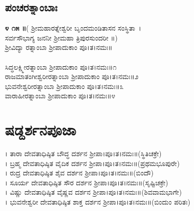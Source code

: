 \subsection{ಪಂಚರತ್ನಾಂಬಾಃ}
{\bfseries ೪ ೧೫ ॥}( ಶ್ರೀಮಹಾರತ್ನೇಶ್ವರೀ ಬೃಂದಮಂಡಿತಾಸನ ಸಂಸ್ಥಿತಾ~।\\
ಸರ್ವಸೌಭಾಗ್ಯ ಜನನೀ ಶ್ರೀಮಹಾ ತ್ರಿಪುರಸುಂದರೀ ॥)\\
ಶ್ರೀವಿದ್ಯಾ ರತ್ನಾಂಬಾ ಶ್ರೀಪಾದುಕಾಂ ಪೂ।ತ।ನಮಃ॥\\
\\ಸಿದ್ಧಲಕ್ಷ್ಮೀರತ್ನಾಂಬಾ ಶ್ರೀಪಾದುಕಾಂ ಪೂ।ತ।ನಮಃ॥೧\\
ರಾಜಮಾತಂಗೀಶ್ವರೀರತ್ನಾಂಬಾ ಶ್ರೀಪಾದುಕಾಂ ಪೂ।ತ।ನಮಃ॥೨\\
ಭುವನೇಶ್ವರೀರತ್ನಾಂಬಾ ಶ್ರೀಪಾದುಕಾಂ ಪೂ।ತ।ನಮಃ॥೩\\
ವಾರಾಹೀರತ್ನಾಂಬಾ ಶ್ರೀಪಾದುಕಾಂ ಪೂ।ತ।ನಮಃ॥೪
\section{ಷಡ್ದರ್ಶನಪೂಜಾ}
। ತಾರಾ ದೇವತಾಧಿಷ್ಠಿತ ಬೌದ್ಧ ದರ್ಶನ ಶ್ರೀಪಾ।ಪೂ।ತ।ನಮಃ॥(ಸ್ಥಿತಿಚಕ್ರೇ)\\
। ಬ್ರಹ್ಮ ದೇವತಾಧಿಷ್ಠಿತ ವೈದಿಕ ದರ್ಶನ ಶ್ರೀಪಾ।ಪೂ।ತ।ನಮಃ॥(ಪ್ರಥಮಭೂಪುರೇ)\\
 । ರುದ್ರ ದೇವತಾಧಿಷ್ಠಿತ ಶೈವ ದರ್ಶನ ಶ್ರೀಪಾ।ಪೂ।ತ।ನಮಃ॥(ಬಿಂದೌ)\\
। ಸೂರ್ಯ ದೇವತಾಧಿಷ್ಠಿತ ಸೌರ ದರ್ಶನ ಶ್ರೀಪಾ।ಪೂ।ತ।ನಮಃ॥(ಸೃಷ್ಟಿಚಕ್ರೇ)\\
। ವಿಷ್ಣು ದೇವತಾಧಿಷ್ಠಿತ ವೈಷ್ಣವ ದರ್ಶನ ಶ್ರೀಪಾ।ಪೂ।ತ।ನಮಃ॥(ಶಿವವಾಮಭಾಗೇ)\\
। ಭುವನೇಶ್ವರೀ ದೇವತಾಧಿಷ್ಠಿತ ಶಾಕ್ತ ದರ್ಶನ ಶ್ರೀಪಾ।ಪೂ।ತ।ನಮಃ॥(ಬಿಂದುಂ ಪರಿತಃ)
